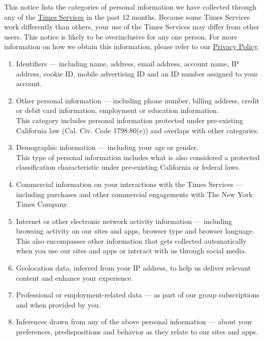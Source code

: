This notice lists the categories of personal information we have
collected through any of the
\href{http://www.nytimes3xbfgragh.onion/privacy/privacy-policy}{Times
Services} in the past 12 months. Because some Times Services work
differently than others, your use of the Times Services may differ from
other users. This notice is likely to be overinclusive for any one
person. For more information on how we obtain this information, please
refer to our
\href{http://www.nytimes3xbfgragh.onion/privacy/privacy-policy\#what-information-do-we-gather-about-you}{Privacy
Policy}.

\begin{enumerate}
\def\labelenumi{\arabic{enumi}.}
\item
  Identifiers --- including name, address, email address, account name,
  IP address, cookie ID, mobile advertising ID and an ID number assigned
  to your account.
\item
  Other personal information --- including phone number, billing
  address, credit or debit card information, employment or education
  information.\\
  This category includes personal information protected under
  pre-existing California law (Cal. Civ. Code 1798.80(e)) and overlaps
  with other categories.
\item
  Demographic information --- including your age or gender.\\
  This type of personal information includes what is also considered a
  protected classification characteristic under pre-existing California
  or federal laws.
\item
  Commercial information on your interactions with the Times Services
  --- including purchases and other commercial engagements with The New
  York Times Company.
\item
  Internet or other electronic network activity information ---
  including browsing activity on our sites and apps, browser type and
  browser language. This also encompasses other information that gets
  collected automatically when you use our sites and apps or interact
  with us through social media.
\item
  Geolocation data, inferred from your IP address, to help us deliver
  relevant content and enhance your experience.
\item
  Professional or employment-related data --- as part of our group
  subscriptions and when provided by you.
\item
  Inferences drawn from any of the above personal information --- about
  your preferences, predispositions and behavior as they relate to our
  sites and apps.
\end{enumerate}

